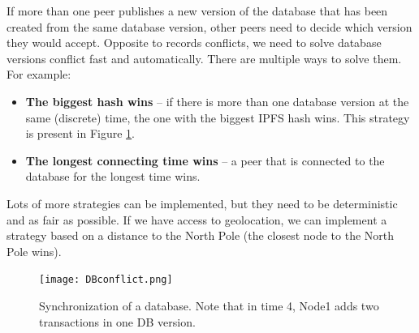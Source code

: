If more than one peer publishes a new version of the database that has been created from the same database version, other peers need to decide which version they would accept. Opposite to records conflicts, we need to solve database versions conflict fast and automatically. There are multiple ways to solve them. For example: 
\begin{itemize}
    \item \textbf{The biggest hash wins} -- if there is more than one database version at the same (discrete) time, the one with the biggest IPFS hash wins. This strategy is present in Figure \ref{databaseConflict}. 
    \item \textbf{The longest connecting time wins} -- a peer that is connected to the database for the longest time wins.
\end{itemize}
Lots of more strategies can be implemented, but they need to be deterministic and as fair as possible. If we have access to geolocation, we can implement a strategy based on a distance to the North Pole (the closest node to the North Pole wins).\cite{lamport2019time}

\begin{figure}[h]
    \centering
    \texttt{[image: DBconflict.png]}
    \caption{Synchronization of a database. Note that in time 4, Node1 adds two transactions in one DB version.}
    \label{databaseConflict}
\end{figure}

